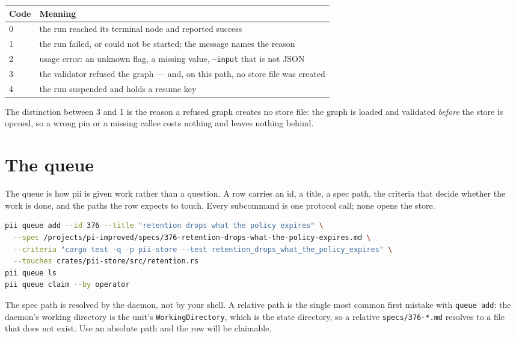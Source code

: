 \begin{center}
\begin{tabular}{@{}p{}p{}@{}}
	\toprule
	\textbf{Code} & \textbf{Meaning} \\
	\midrule
	0 & the run reached its terminal node and reported success \\
	1 & the run failed, or could not be started; the message names the reason \\
	2 & usage error: an unknown flag, a missing value, \texttt{--input} that is not JSON \\
	3 & the validator refused the graph --- and, on this path, no store file was created \\
	4 & the run suspended and holds a resume key \\
	\bottomrule
\end{tabular}
\end{center}

The distinction between 3 and 1 is the reason a refused graph creates no store file: the
graph is loaded and validated \emph{before} the store is opened, so a wrong pin or a
missing callee costs nothing and leaves nothing behind.

\section{The queue}

The queue is how pii is given work rather than a question. A row carries an id, a title, a
spec path, the criteria that decide whether the work is done, and the paths the row expects
to touch. Every subcommand is one protocol call; none opens the store.

\begin{lstlisting}[language=bash]
pii queue add --id 376 --title "retention drops what the policy expires" \
  --spec /projects/pi-improved/specs/376-retention-drops-what-the-policy-expires.md \
  --criteria "cargo test -q -p pii-store --test retention_drops_what_the_policy_expires" \
  --touches crates/pii-store/src/retention.rs
pii queue ls
pii queue claim --by operator
\end{lstlisting}

The spec path is resolved by the daemon, not by your shell. A relative path is the single
most common first mistake with \texttt{queue add}: the daemon's working directory is the
unit's \texttt{WorkingDirectory}, which is the state directory, so a relative
\texttt{specs/376-*.md} resolves to a file that does not exist. Use an absolute path and
the row will be claimable.

